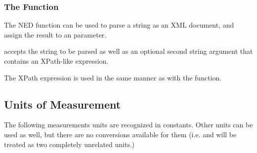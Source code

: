 {\subsubsection{The  Function}
\label{sec:ned-ref:xml-function}

The  NED function can be used to parse a string as an
XML document, and assign the result to an  parameter.

 accepts the string to be parsed as well as an optional
second string argument that contains an XPath-like expression.

The XPath expression is used in the same manner as with the
 function.


\subsection{Units of Measurement}
\label{sec:ned-ref:units}

The following measurements units are recognized in constants. Other units can
be used as well, but there are no conversions available for them (i.e.
 and  will be treated as two completely unrelated
units.)

}
